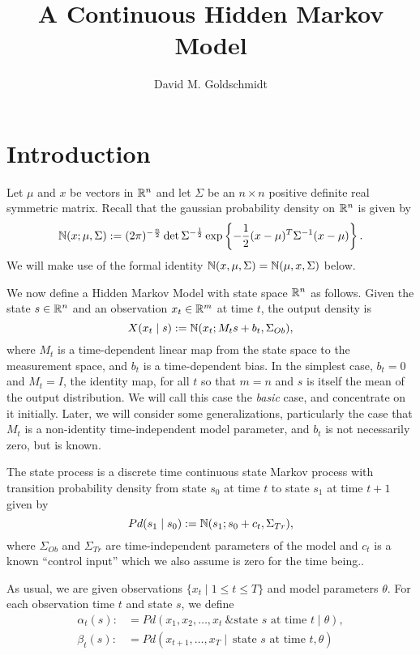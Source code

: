 \documentclass[12pt,leqno]{article}
\title{A Continuous Hidden Markov Model}
\author{David M. Goldschmidt}
\begin{document}
\newcommand{\p}{\ensuremath{u}}
\newcommand{\VV}{V}
\maketitle


\section{Introduction}
Let $\mu$ and $x$ be vectors in ${\mathbb R}^n$ and let $\Sigma$ be an $n\times{n}$ positive
definite real symmetric matrix.  Recall that the gaussian probability density
on ${\mathbb R}^n$ is given by 
$$
{\mathbb N}(x;\mu,\Sigma) := (2\pi)^{-\frac{n}{2}}\det{\Sigma}^{-\frac{1}{2}}\exp\left\{-\frac{1}{2}
(x - \mu)^T\Sigma^{-1}(x-\mu)\right\}.
$$
We will make use of the formal identity ${\mathbb N}(x,\mu,\Sigma) = {\mathbb N}(\mu,x,\Sigma)$ below.

We now define a Hidden Markov Model with state space ${\mathbb R}^n$ as follows.  Given the state $s\in{\mathbb R}^n$ and an observation $x_t\in{\mathbb R}^m$ at time $t$, the output density is
$$
X(x_t\mid s) := {\mathbb N}(x_t;M_ts + b_t,\Sigma_{Ob}),
$$
where $M_t$ is a time-dependent linear map from the state space to the
measurement space, and $b_t$ is a time-dependent bias.
In the simplest case, $b_t = 0$  and $M_t = I$, the identity map, for all $t$ so that $m = n$ and $s$ is itself the mean of the output distribution.  We will call this case the {\em basic} case, and concentrate on it initially. Later, we will consider some generalizations, particularly the case that $M_t$ is a non-identity time-independent model parameter, and $b_t$ is not necessarily zero, but is known. 

The state process is a discrete time continuous state Markov process with transition probability density
from state $s_0$ at time $t$ to state $s_1$ at time $t+1$ given by
$$
Pd(s_1\mid s_0) :=  {\mathbb N}(s_1;s_0+c_t,\Sigma_{Tr}),
$$
where $\Sigma_{Ob}$ and $\Sigma_{Tr}$ are time-independent parameters of the model
and $c_t$ is a known ``control input'' which we also assume is zero for the time being..

As usual, we are given observations $\{x_t\mid 1\le t\le T\}$ and model parameters $\theta$.  For each observation time $t$ and state $s$, we define
\begin{align*}
  \alpha_t(s) :&= Pd(x_1,x_2,\dots,x_t~ \& \text{state $s$ at time $t$}\mid \theta ),\\
  \beta_t(s) :&= Pd(x_{t+1},\dots,x_T \mid ~\text{state $s$ at time $t$},\theta)\\
\end{align*}
\end{document}
